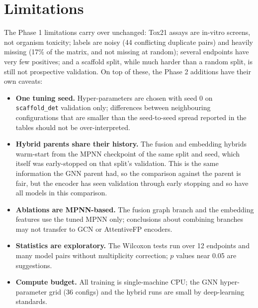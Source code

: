 \section{Limitations}
\label{sec:limitations}
The Phase 1 limitations carry over unchanged: Tox21 assays are in-vitro screens, not
organism toxicity; labels are noisy (44 conflicting duplicate pairs) and heavily missing
(17\% of the matrix, and not missing at random); several endpoints have very few positives;
and a scaffold split, while much harder than a random split, is still not prospective
validation. On top of these, the Phase 2 additions have their own caveats:

\begin{itemize}
\item \textbf{One tuning seed.} Hyper-parameters are chosen with seed 0 on
\texttt{scaffold\_det} validation only; differences between neighbouring configurations
that are smaller than the seed-to-seed spread reported in the tables should not be
over-interpreted.
\item \textbf{Hybrid parents share their history.} The fusion and embedding hybrids
warm-start from the MPNN checkpoint of the same split and seed, which itself was
early-stopped on that split's validation. This is the same information the GNN parent
had, so the comparison against the parent is fair, but the encoder has seen validation
through early stopping and so have all models in this comparison.
\item \textbf{Ablations are MPNN-based.} The fusion graph branch and the embedding
features use the tuned MPNN only; conclusions about combining branches may not transfer
to GCN or AttentiveFP encoders.
\item \textbf{Statistics are exploratory.} The Wilcoxon tests run over 12 endpoints and
many model pairs without multiplicity correction; $p$ values near 0.05 are suggestions.
\item \textbf{Compute budget.} All training is single-machine CPU; the GNN hyper-parameter
grid (36 configs) and the hybrid runs are small by deep-learning standards.
\end{itemize}
